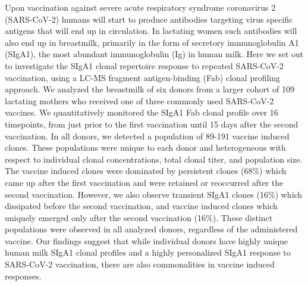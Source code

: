 \begin{abstract102}
  Upon vaccination against severe acute respiratory syndrome coronavirus 2 (SARS-CoV-2) humans will start to produce antibodies targeting virus specific antigens that will end up in circulation. In lactating women such antibodies will also end up in breastmilk, primarily in the form of secretory immunoglobulin A1 (SIgA1), the most abundant immunoglobulin (Ig) in human milk. Here we set out to investigate the SIgA1 clonal repertoire response to repeated SARS-CoV-2 vaccination, using a LC-MS fragment antigen-binding (Fab) clonal profiling approach. We analyzed the breastmilk of six donors from a larger cohort of 109 lactating mothers who received one of three commonly used SARS-CoV-2 vaccines. We quantitatively monitored the SIgA1 Fab clonal profile over 16 timepoints, from just prior to the first vaccination until 15 days after the second vaccination. In all donors, we detected a population of 89-191 vaccine induced clones. These populations were unique to each donor and heterogeneous with respect to individual clonal concentrations, total clonal titer, and population size. The vaccine induced clones were dominated by persistent clones (68\%) which came up after the first vaccination and were retained or reoccurred after the second vaccination. However, we also observe transient SIgA1 clones (16\%) which dissipated before the second vaccination, and vaccine induced clones which uniquely emerged only after the second vaccination (16\%). These distinct populations were observed in all analyzed donors, regardless of the administered vaccine. Our findings suggest that while individual donors have highly unique human milk SIgA1 clonal profiles and a highly personalized SIgA1 response to SARS-CoV-2 vaccination, there are also commonalities in vaccine induced responses.
\end{abstract102}
\thumbforchapter

